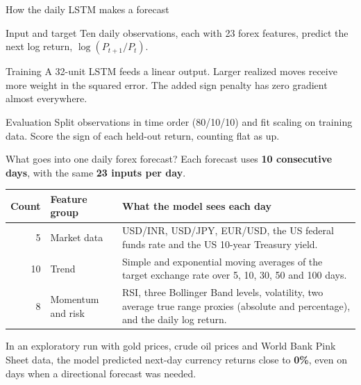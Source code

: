 \documentclass[aspectratio=169,10pt]{beamer}
\newcommand{\key}[1]{\par\smallskip{\color{iitiblue}\bfseries #1}\par}
\begin{document}
\begin{frame}{How the daily LSTM makes a forecast}
\begin{block}{Input and target}
Ten daily observations, each with 23 forex features, predict the next log return, $\log(P_{t+1}/P_t)$.
\end{block}
\begin{block}{Training}
A 32-unit LSTM feeds a linear output. Larger realized moves receive more weight in the squared error. The added sign penalty has zero gradient almost everywhere.
\end{block}
\begin{block}{Evaluation}
Split observations in time order (80/10/10) and fit scaling on training data. Score the sign of each held-out return, counting flat as up.
\end{block}
\end{frame}

\begin{frame}{What goes into one daily forex forecast?}
\small
Each forecast uses \textbf{10 consecutive days}, with the same \textbf{23 inputs per day}.
\medskip

\begin{tabular}{@{}rlp{9.4cm}@{}}\toprule
Count & Feature group & What the model sees each day\\\midrule
5 & Market data & USD/INR, USD/JPY, EUR/USD, the US federal funds rate and the US 10-year Treasury yield.\\
10 & Trend & Simple and exponential moving averages of the target exchange rate over 5, 10, 30, 50 and 100 days.\\
8 & Momentum and risk & RSI, three Bollinger Band levels, volatility, two average true range proxies (absolute and percentage), and the daily log return.\\\bottomrule
\end{tabular}

\key{What happened when we added commodities?}
In an exploratory run with gold prices, crude oil prices and World Bank Pink Sheet data, the model predicted next-day currency returns close to \textbf{0\%}, even on days when a directional forecast was needed.
\end{frame}
\end{document}
